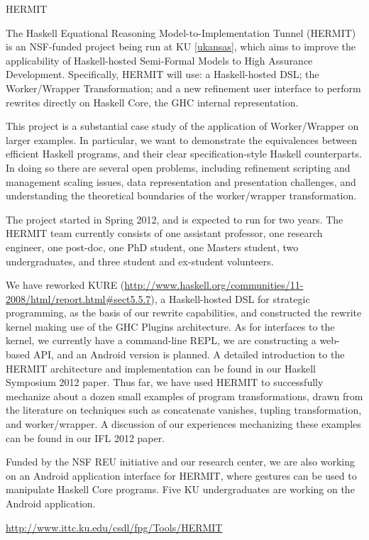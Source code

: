 \begin{hcarentry}[updated]{HERMIT}
\label{HERMIT}
\makeheader

The Haskell Equational Reasoning Model-to-Implementation Tunnel
(HERMIT) is an NSF-funded project being run at KU \cref{ukansas}, which aims to improve the
applicability of Haskell-hosted Semi-Formal Models to High Assurance Development.
Specifically, HERMIT will use: a Haskell-hosted DSL; the Worker/Wrapper Transformation;
and a new refinement user interface to perform rewrites directly on Haskell Core, the GHC internal representation.

This project is a substantial case study of the application of
Worker/Wrapper on larger examples. In particular, we want to
demonstrate the equivalences between efficient Haskell programs, and
their clear specification-style Haskell counterparts. In doing so
there are several open problems, including refinement scripting and
management scaling issues, data representation and presentation
challenges, and understanding the theoretical boundaries of the
worker/wrapper transformation.

The project started in Spring 2012, and is expected to run for two years.
The HERMIT team currently consists of
one assistant professor, %
one research engineer, %
one post-doc, %
one PhD student, %
one Masters student, %
two undergraduates,
and three student and ex-student volunteers. %
%
%

We have reworked KURE (\url{http://www.haskell.org/communities/11-2008/html/report.html#sect5.5.7}), a Haskell-hosted DSL for strategic programming, as the basis of our rewrite capabilities, and constructed the rewrite kernel making use of the GHC Plugins architecture.
As for interfaces to the kernel, we currently have a command-line REPL, we are constructing a web-based API, and an Android version is planned.
A detailed introduction to the HERMIT architecture and implementation can be found in our Haskell Symposium 2012 paper.
Thus far, we have used HERMIT to successfully mechanize about a dozen small examples of program transformations, drawn from the literature on techniques such as concatenate vanishes, tupling transformation, and worker/wrapper.
A discussion of our experiences mechanizing these examples can be found in our IFL 2012 paper.

Funded by the NSF REU initiative and our research center,
we are also working on an Android application interface for HERMIT,
where gestures can be used to manipulate Haskell Core programs.
Five KU undergraduates are working on the Android application.

\FurtherReading
  \url{http://www.ittc.ku.edu/csdl/fpg/Tools/HERMIT}
\end{hcarentry}
